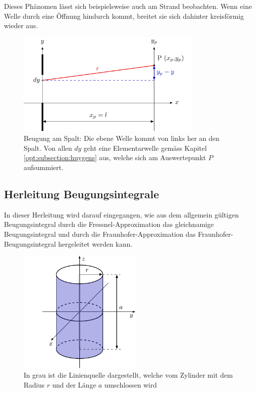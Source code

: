 Dieses Phänomen lässt sich beispielsweise auch am Strand beobachten. 
Wenn eine Welle durch eine Öffnung hindurch kommt, breitet sie sich dahinter kreisförmig wieder aus.

\begin{figure}
    \centering
    \includegraphics[width=90mm]{papers/opt/images/derivation.pdf}
    \caption{Beugung am Spalt: Die ebene Welle kommt von links her an den Spalt. 
    Von allen $dy$ geht eine Elementarwelle gemäss Kapitel \ref{opt:subsection:huygens} aus, welche sich am Auswertepunkt $P$ aufsummiert.}
    \label{opt:fig:geometricalShape}
\end{figure}

\subsection{Herleitung Beugungsintegrale}
In dieser Herleitung wird darauf eingegangen, wie aus dem allgemein gültigen Beugungsintegral durch die Fressnel-Approximation 
das gleichnamige Beugungsintegral und durch die Fraunhofer-Approximation das Fraunhofer-Beugungsintegral hergeleitet werden kann.

\begin{figure}
    \centering
    \includegraphics[width=60mm]{papers/opt/images/maxwell.pdf}
    \caption{In grau ist die Linienquelle dargestellt, welche vom Zylinder mit dem Radius $r$ und der Länge $a$ umschlossen wird}
    \label{opt:fig:maxwell}
\end{figure}

